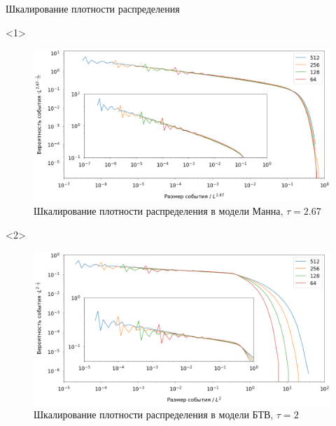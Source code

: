\documentclass{beamer}
\begin{document}
	\begin{frame}{Шкалирование плотности распределения}
		\begin{onlyenv}<1>
			\begin{figure}[h]
				\centering
				\includegraphics[width=\textwidth]{images/manna_distribution_267}
				\caption*{Шкалирование плотности распределения в модели Манна, $\tau = 2.67$}
			\end{figure}
		\end{onlyenv}
		
		\begin{onlyenv}<2>
			\begin{figure}[h]
				\centering
				\includegraphics[width=\textwidth]{images/btw_distribution_200}
				\caption*{Шкалирование плотности распределения в модели БТВ, $\tau = 2$}
			\end{figure}
		\end{onlyenv}
	

\end{frame}
\end{document}
